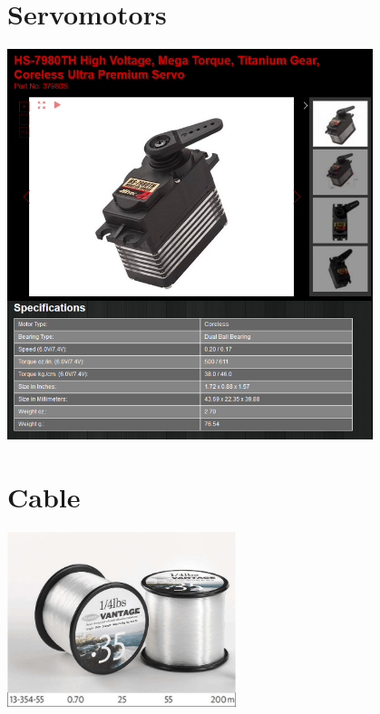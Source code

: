\documentclass[11pt]{article}
\begin{document}
\begin{appendices}
\section{Servomotors}
\label{appendix:servos}

\begin{center}
\includegraphics[width=0.8\textwidth]{images/servoSpecs.png}
\label{figure:servoSpes}
\end{center}

\section{Cable}
\label{appendix:cable}

\begin{center}
\includegraphics[width=0.5\textwidth]{images/cable.png}
\label{figure:cable}
\end{center}


\end{appendices}
\end{document}
